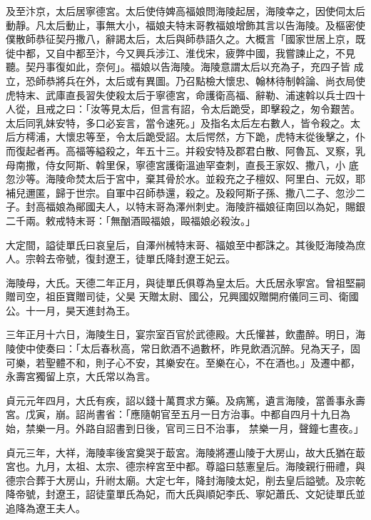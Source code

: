 \begin{pinyinscope}
 及至汴京，太后居寧德宮。太后使侍婢高福娘問海陵起居，海陵幸之，因使伺太后動靜。凡太后動止，事無大小，福娘夫特末哥教福娘增飾其言以告海陵。及樞密使僕散師恭征契丹撒八，辭謁太后，太后與師恭語久之。大概言「國家世居上京，既徙中都，又自中都至汴，今又興兵涉江、淮伐宋，疲弊中國，我嘗諫止之，不見聽。契丹事復如此，奈何」。福娘以告海陵。海陵意謂太后以充為子，充四子皆
 成立，恐師恭將兵在外，太后或有異圖。乃召點檢大懷忠、翰林待制斡論、尚衣局使虎特末、武庫直長習失使殺太后于寧德宮，命護衛高福、辭勒、浦速斡以兵士四十人從，且戒之曰：「汝等見太后，但言有詔，令太后跪受，即擊殺之，匆令艱苦。太后同乳妹安特，多口必妄言，當令速死。」及指名太后左右數人，皆令殺之。太后方樗浦，大懷忠等至，令太后跪受詔。太后愕然，方下跪，虎特末從後擊之，仆而復起者再。高福等縊殺之，年五十三。并殺安特及郡君白散、阿魯瓦、叉察，乳母南撒，侍女阿斯、斡里保，寧德宮護衛溫迪罕查刺，直長王家奴、撒八，小
 底忽沙等。海陵命焚太后于宮中，棄其骨於水。並殺充之子檀奴、阿里白、元奴，耶補兒邇匿，歸于世宗。自軍中召師恭還，殺之。及殺阿斯子孫、撒八二子、忽沙二子。封高福娘為鄖國夫人，以特末哥為澤州刺史。海陵許福娘征南回以為妃，賜銀二千兩。敕戒特末哥：「無酗酒毆福娘，毆福娘必殺汝。」



 大定間，謚徒單氏曰哀皇后，自澤州械特末哥、福娘至中都誅之。其後貶海陵為庶人。宗斡去帝號，復封遼王，徒單氏降封遼王妃云。



 海陵母，大氏。天德二年正月，與徒單氏俱尊為皇太后。大氏居永寧宮。曾祖堅嗣贈司空，祖臣寶贈司徒，父昊
 天贈太尉、國公，兄興國奴贈開府儀同三司、衛國公。十一月，昊天進封為王。



 三年正月十六日，海陵生日，宴宗室百官於武德殿。大氏懽甚，飲盡醉。明日，海陵使中使奏曰：「太后春秋高，常日飲酒不過數杯，昨見飲酒沉醉。兒為天子，固可樂，若聖體不和，則子心不安，其樂安在。至樂在心，不在酒也。」及遷中都，永壽宮獨留上京，大氏常以為言。



 貞元元年四月，大氏有疾，詔以錢十萬貫求方藥。及病篤，遺言海陵，當善事永壽宮。戊寅，崩。詔尚書省：「應隨朝官至五月一日方治事。中都自四月十九日為始，禁樂一月。外路自詔書到日後，官司三日不治事，
 禁樂一月，聲鐘七晝夜。」



 貞元三年，大祥，海陵率後宮奠哭于菆宮。海陵將遷山陵于大房山，故大氏猶在菆宮也。九月，太祖、太宗、德宗梓宮至中都。尊謚曰慈憲皇后。海陵親行冊禮，與德宗合葬于大房山，升祔太廟。大定七年，降封海陵太妃，削去皇后謚號。及宗乾降帝號，封遼王，詔徒童單氏為妃，而大氏與順妃李氏、寧妃蕭氏、文妃徒單氏並追降為遼王夫人。




\end{pinyinscope}
